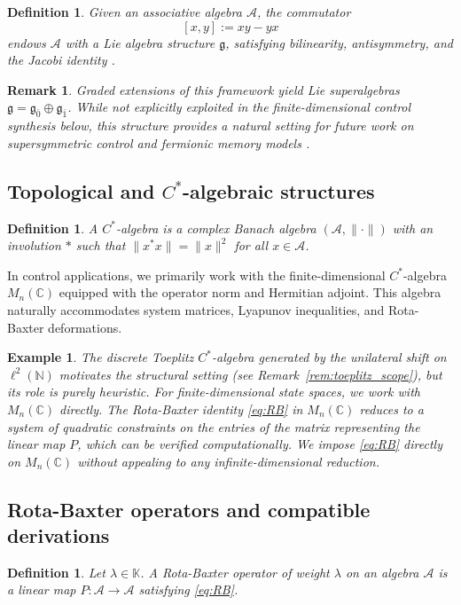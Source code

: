 \documentclass[10pt]{amsart}
\newcommand{\Ac}{\mathcal{A}}
\numberwithin{equation}{section}
\newtheorem{remark}[theorem]{Remark}
\newtheorem{example}[theorem]{Example}
\newtheorem{definition}[theorem]{Definition}
\begin{document}
\begin{definition}
Given an associative algebra \(\Ac\), the commutator
\[
[x, y] := x y - y x
\]
endows \(\Ac\) with a Lie algebra structure \(\mathfrak{g}\), satisfying bilinearity,
antisymmetry, and the Jacobi identity \cite{Humphreys1972}.
\end{definition}

\begin{remark}
Graded extensions of this framework yield Lie superalgebras
\(\mathfrak{g} = \mathfrak{g}_{\bar{0}} \oplus \mathfrak{g}_{\bar{1}}\). While not
explicitly exploited in the finite-dimensional control synthesis below, this structure
provides a natural setting for future work on supersymmetric control and fermionic memory
models \cite{Kac1977}.
\end{remark}

\subsection{Topological and \(C^*\)-algebraic structures}
\begin{definition}
A \(C^*\)-algebra is a complex Banach algebra \((\Ac, \|\cdot\|)\) with an involution
\(*\) such that \(\|x^* x\| = \|x\|^2\) for all \(x \in \Ac\).
\end{definition}

In control applications, we primarily work with the finite-dimensional \(C^*\)-algebra
\(M_n(\mathbb{C})\) equipped with the operator norm and Hermitian adjoint. This algebra
naturally accommodates system matrices, Lyapunov inequalities, and Rota-Baxter
deformations.

\begin{example}
The discrete Toeplitz \(C^*\)-algebra generated by the unilateral shift on
\(\ell^2(\mathbb{N})\) motivates the structural setting (see
Remark~\ref{rem:toeplitz_scope}), but its role is purely heuristic. For finite-dimensional
state spaces, we work with \(M_n(\mathbb{C})\) directly. The Rota-Baxter identity
\eqref{eq:RB} in $M_n(\mathbb{C})$ reduces to a system of quadratic constraints on the
entries of the matrix representing the linear map $P$, which can be verified
computationally. We impose \eqref{eq:RB} directly on $M_n(\mathbb{C})$ without appealing
to any infinite-dimensional reduction.
\end{example}

\subsection{Rota-Baxter operators and compatible derivations}
\begin{definition}
Let \(\lambda \in \mathbb{K}\). A \emph{Rota-Baxter operator} of weight \(\lambda\) on
an algebra \(\Ac\) is a linear map \(P : \Ac \to \Ac\) satisfying \eqref{eq:RB}.
\end{definition}
\end{document}
